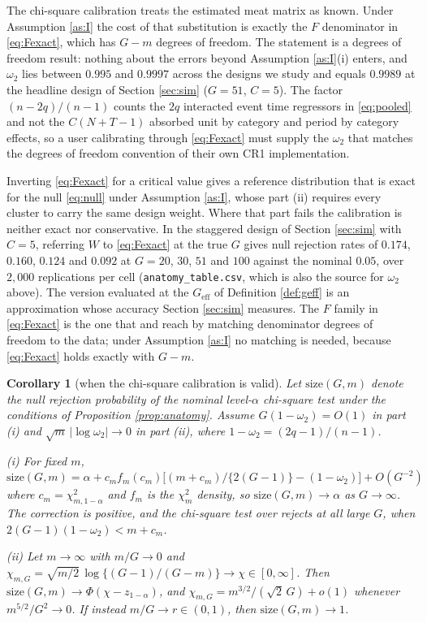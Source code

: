 \documentclass[12pt]{article}
\newtheorem{corollary}{Corollary}
\theoremstyle{definition}
\numberwithin{equation}{section}
\begin{document}
The chi-square calibration treats the estimated meat matrix as known. Under
Assumption \ref{as:I} the cost of that substitution is exactly the $F$
denominator in \eqref{eq:Fexact}, which has $G - m$ degrees of freedom. The
statement is a degrees of freedom result: nothing about the errors beyond
Assumption \ref{as:I}(i) enters, and $\omega_2$ lies between $0.995$ and $0.9997$ across the designs we
study and equals $0.9989$ at the headline
design of Section \ref{sec:sim} ($G = 51$, $C = 5$). The factor $(n-2q)/(n-1)$
counts the $2q$ interacted event time regressors in \eqref{eq:pooled} and not
the $C(N+T-1)$ absorbed unit by category and period by category effects, so a
user calibrating through \eqref{eq:Fexact} must supply the $\omega_2$ that
matches the degrees of freedom convention of their own CR1 implementation.

Inverting \eqref{eq:Fexact} for a critical value gives a reference distribution
that is exact for the null \eqref{eq:null} under Assumption \ref{as:I}, whose
part (ii) requires every cluster to carry the same design weight. Where that
part fails the calibration is neither exact nor conservative. In the staggered
design of Section \ref{sec:sim} with $C = 5$, referring $W$ to \eqref{eq:Fexact}
at the true $G$ gives null rejection rates of $0.174$, $0.160$, $0.124$ and
$0.092$ at $G = 20$, $30$, $51$ and $100$ against the nominal $0.05$, over
$2{,}000$ replications per cell (\texttt{anatomy\_table.csv}, which is also the
source for $\omega_2$ above). The version evaluated at the $G_{\mathrm{eff}}$ of
Definition \ref{def:geff} is an approximation whose accuracy Section
\ref{sec:sim} measures.
The $F$ family in \eqref{eq:Fexact} is the one that \citet{tipton2015small} and
\citet{pustejovsky2018small} reach by matching denominator degrees of freedom to
the data; under Assumption \ref{as:I} no matching is needed, because
\eqref{eq:Fexact} holds exactly with $G - m$.

\begin{corollary}[when the chi-square calibration is valid]
\label{cor:asym}
Let $\mathrm{size}(G,m)$ denote the null rejection probability of the nominal
level-$\alpha$ chi-square test under the conditions of Proposition
\ref{prop:anatomy}. Assume $G(1-\omega_2) = O(1)$ in part (i) and
$\sqrt{m}\,|\log \omega_2| \to 0$ in part (ii), where $1 - \omega_2 =
(2q-1)/(n-1)$.

\noindent (i) For fixed $m$, $\mathrm{size}(G,m) = \alpha + c_m f_m(c_m)
\big[(m + c_m)/\{2(G-1)\} - (1-\omega_2)\big] + O(G^{-2})$ where $c_m =
\chi^2_{m,1-\alpha}$ and $f_m$ is the $\chi^2_m$ density, so
$\mathrm{size}(G,m) \to \alpha$ as $G \to \infty$. The correction is positive,
and the chi-square test over rejects at all large $G$, when
$2(G-1)(1-\omega_2) < m + c_m$.

\noindent (ii) Let $m \to \infty$ with $m/G \to 0$ and $\chi_{m,G} =
\sqrt{m/2}\,\log\{(G-1)/(G-m)\} \to \chi \in [0,\infty]$. Then
$\mathrm{size}(G,m) \to \Phi(\chi - z_{1-\alpha})$, and $\chi_{m,G} =
m^{3/2}/(\sqrt{2}\,G) + o(1)$ whenever $m^{5/2}/G^2 \to 0$. If instead
$m/G \to r \in (0,1)$, then $\mathrm{size}(G,m) \to 1$.
\end{corollary}
\end{document}
